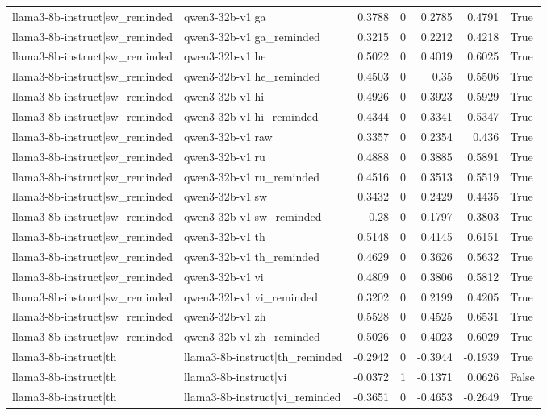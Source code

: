 \begin{table}
\begin{tabular}{l l r r r r l}
llama3-8b-instruct|sw_reminded & qwen3-32b-v1|ga & 0.3788 & 0 & 0.2785 & 0.4791 & True \\
llama3-8b-instruct|sw_reminded & qwen3-32b-v1|ga_reminded & 0.3215 & 0 & 0.2212 & 0.4218 & True \\
llama3-8b-instruct|sw_reminded & qwen3-32b-v1|he & 0.5022 & 0 & 0.4019 & 0.6025 & True \\
llama3-8b-instruct|sw_reminded & qwen3-32b-v1|he_reminded & 0.4503 & 0 & 0.35 & 0.5506 & True \\
llama3-8b-instruct|sw_reminded & qwen3-32b-v1|hi & 0.4926 & 0 & 0.3923 & 0.5929 & True \\
llama3-8b-instruct|sw_reminded & qwen3-32b-v1|hi_reminded & 0.4344 & 0 & 0.3341 & 0.5347 & True \\
llama3-8b-instruct|sw_reminded & qwen3-32b-v1|raw & 0.3357 & 0 & 0.2354 & 0.436 & True \\
llama3-8b-instruct|sw_reminded & qwen3-32b-v1|ru & 0.4888 & 0 & 0.3885 & 0.5891 & True \\
llama3-8b-instruct|sw_reminded & qwen3-32b-v1|ru_reminded & 0.4516 & 0 & 0.3513 & 0.5519 & True \\
llama3-8b-instruct|sw_reminded & qwen3-32b-v1|sw & 0.3432 & 0 & 0.2429 & 0.4435 & True \\
llama3-8b-instruct|sw_reminded & qwen3-32b-v1|sw_reminded & 0.28 & 0 & 0.1797 & 0.3803 & True \\
llama3-8b-instruct|sw_reminded & qwen3-32b-v1|th & 0.5148 & 0 & 0.4145 & 0.6151 & True \\
llama3-8b-instruct|sw_reminded & qwen3-32b-v1|th_reminded & 0.4629 & 0 & 0.3626 & 0.5632 & True \\
llama3-8b-instruct|sw_reminded & qwen3-32b-v1|vi & 0.4809 & 0 & 0.3806 & 0.5812 & True \\
llama3-8b-instruct|sw_reminded & qwen3-32b-v1|vi_reminded & 0.3202 & 0 & 0.2199 & 0.4205 & True \\
llama3-8b-instruct|sw_reminded & qwen3-32b-v1|zh & 0.5528 & 0 & 0.4525 & 0.6531 & True \\
llama3-8b-instruct|sw_reminded & qwen3-32b-v1|zh_reminded & 0.5026 & 0 & 0.4023 & 0.6029 & True \\
llama3-8b-instruct|th & llama3-8b-instruct|th_reminded & -0.2942 & 0 & -0.3944 & -0.1939 & True \\
llama3-8b-instruct|th & llama3-8b-instruct|vi & -0.0372 & 1 & -0.1371 & 0.0626 & False \\
llama3-8b-instruct|th & llama3-8b-instruct|vi_reminded & -0.3651 & 0 & -0.4653 & -0.2649 & True \\

\end{tabular}
\end{table}
